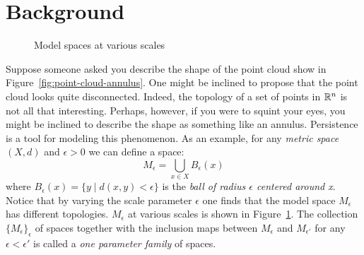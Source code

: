 \section{Background}

 \begin{figure}
\centering
 \hspace{.5cm}
 \hspace{.25cm}
 \hspace{.25cm}
\caption{Model spaces at various scales}
\label{model-spaces}
\end{figure}

Suppose someone asked you describe the shape of the point cloud show in Figure~\ref{fig:point-cloud-annulus}. One might be inclined to propose that the point cloud looks quite disconnected. Indeed, the topology of a set of points in $\mathbb{R}^n$ is not all that interesting. Perhaps, however, if you were to squint your eyes, you might be inclined to describe the shape as something like an annulus. Persistence is a tool for modeling this phenomenon. As an example, for any \emph{metric space} $(X,d)$ and  $\epsilon > 0$ we can define a space: \[ M_\epsilon = \bigcup_{x \in X} B_{\epsilon}(x) \] where $B_{\epsilon}(x) = \{ y \mid d(x,y) < \epsilon\} $ is the \emph{ball of radius $\epsilon$ centered around x}. Notice that by varying the scale parameter $\epsilon$ one finds that the model space $M_\epsilon$ has different topologies. $M_\epsilon$ at various scales is shown in Figure~\ref{model-spaces}. The collection $\{M_\epsilon\}_\epsilon$ of spaces together with the inclusion maps between $M_\epsilon$ and $M_{\epsilon'}$ for any $\epsilon < \epsilon'$ is called a \emph{one parameter family} of spaces.   
 
